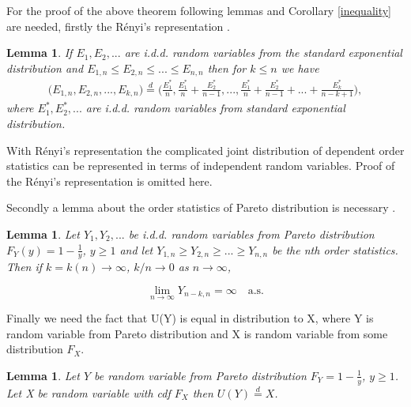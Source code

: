\documentclass[english,12pt,a4paper,pdftex,sci,utf8]{aaltothesis} %
\newtheorem{lemma}[theorem]{Lemma}
\begin{document}
For the proof of the above theorem following lemmas and Corollary \ref{inequality} are needed, firstly the R{\'e}nyi's representation \cite{renyi}.
\begin{lemma}
If $E_1, E_2,...$ are i.d.d. random variables from the standard exponential distribution and $E_{1,n} \leq E_{2,n} \leq ... \leq E_{n,n}$ then for $k \leq n$ we have
\begin{multline*}
\big(E_{1,n}, E_{2,n}, ... , E_{k,n}\big) 
\overset{d}{=} \Big(\frac{E_1^*}{n}, \frac{E_1^*}{n}+\frac{E_2^*}{n-1}, ... , \frac{E_1^*}{n}+\frac{E_2^*}{n-1}+...+ \frac{E_k^*}{n-k+1}\Big),
\end{multline*}
where $E_1^*,E_2^*,...$ are i.d.d. random variables from standard exponential distribution.
\label{renrep}
\end{lemma}

With R{\'e}nyi's representation the complicated joint distribution of dependent order statistics can be represented in terms of independent random variables. Proof of the R{\'e}nyi's representation is omitted here.

Secondly a lemma about the order statistics of Pareto distribution is necessary \cite{deHaan}.

\begin{lemma}
Let $Y_1, Y_2, ...$ be i.d.d. random variables from Pareto distribution $F_Y(y)=1-\frac{1}{y}$, $y \geq 1$ and let $Y_{1,n} \geq Y_{2,n} \geq ... \geq Y_{n,n}$ be the nth order statistics. Then if $k=k(n)  \rightarrow \infty$, $k/n \rightarrow 0$ as $n \rightarrow \infty$,

\begin{equation*}
\lim_{n\to\infty} Y_{n-k,n} = \infty  \quad  \text{a.s}.
\end{equation*}
\label{asconv}
\end{lemma}


Finally we need the fact that U(Y) is equal in distribution to X, where Y is random variable from Pareto distribution and X is random variable from some distribution $F_X$.

\begin{lemma}
Let $Y$ be random variable from Pareto distribution $F_Y=1-\frac{1}{y}$, $y \geq 1$. Let X be random variable with cdf $F_X$ then $U(Y) \overset{d}{=} X$.
\label{U}
\end{lemma}
\end{document}
